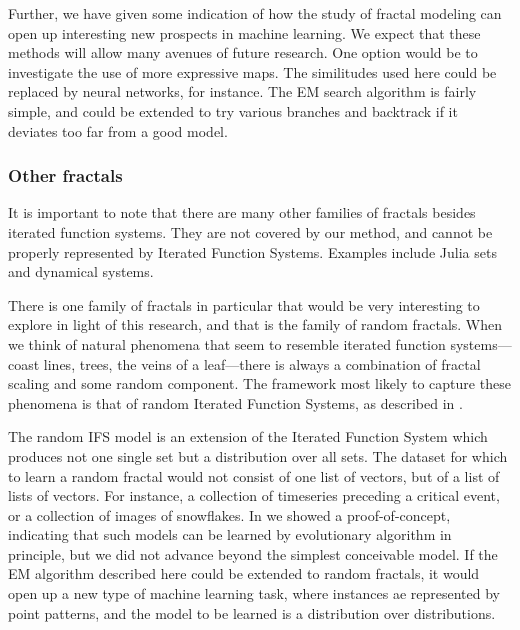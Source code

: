 \documentclass[10pt,a4paper,oneside]{article}
\theoremstyle{definition}
\begin{document}
Further, we have given some indication of how the study of fractal modeling can open up interesting new prospects in machine learning. We expect that these methods will allow many avenues of future research. One option would be to investigate the use of more expressive maps. The similitudes used here could be replaced by neural networks, for instance. The EM search algorithm is fairly simple, and could be extended to try various branches and backtrack if it deviates too far from a good model.

\subsubsection*{Other fractals}

It is important to note that there are many other families of fractals besides iterated function systems. They are not covered by our method, and cannot be properly represented by Iterated Function Systems. Examples include Julia sets and dynamical systems.

There is one family of fractals in particular that would be very interesting to explore in light of this research, and that is the family of random fractals. When we think of natural phenomena that seem to resemble iterated function systems---coast lines, trees, the veins of a leaf---there is always a combination of fractal scaling and some random component. The framework most likely to capture these phenomena is that of random Iterated Function Systems, as described in \cite{hutchinson2000deterministic}.

The random IFS model is an extension of the Iterated Function System which produces not one single set but a distribution over all sets. The dataset for which to learn a random fractal would not consist of one list of vectors, but of a list of lists of vectors. For instance, a collection of timeseries preceding a critical event, or a collection of images of snowflakes. In \cite{bloem2010fractal} we showed a proof-of-concept, indicating that such models can be learned by evolutionary algorithm in principle, but we did not advance beyond the simplest conceivable model. If the EM algorithm described here could be extended to random fractals, it would open up a new type of machine learning task, where instances ae represented by point patterns, and the model to be learned is a distribution over distributions.  



\end{document}
